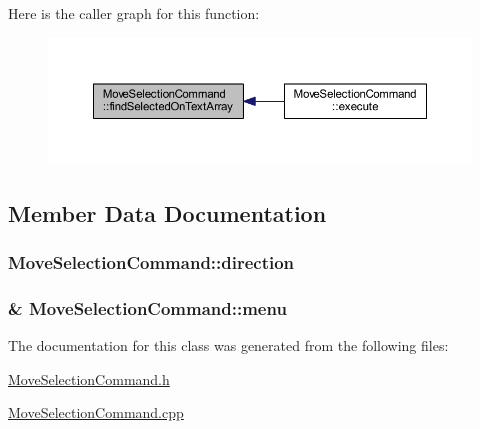 Here is the caller graph for this function\+:
\nopagebreak
\begin{figure}[H]
\begin{center}
\leavevmode
\includegraphics[width=350pt]{class_move_selection_command_a6a9d0bed09292f4465c3a09a847ed0be_icgraph}
\end{center}
\end{figure}




\subsection{Member Data Documentation}
\hypertarget{class_move_selection_command_a2dd06420c7d00cd5da4ac920e062f1cd}{}
\subsubsection[{direction}]{ Move\+Selection\+Command\+::direction\hspace{0.3cm}{\ttfamily [private]}}\label{class_move_selection_command_a2dd06420c7d00cd5da4ac920e062f1cd}
\hypertarget{class_move_selection_command_a744230c9fb6c308c2f05a08d7c45e4c2}{}
\subsubsection[{menu}]{\& Move\+Selection\+Command\+::menu\hspace{0.3cm}{\ttfamily [private]}}\label{class_move_selection_command_a744230c9fb6c308c2f05a08d7c45e4c2}


The documentation for this class was generated from the following files\+:\begin{DoxyCompactItemize}
\item 
\hyperlink{_move_selection_command_8h}{Move\+Selection\+Command.\+h}\item 
\hyperlink{_move_selection_command_8cpp}{Move\+Selection\+Command.\+cpp}\end{DoxyCompactItemize}
